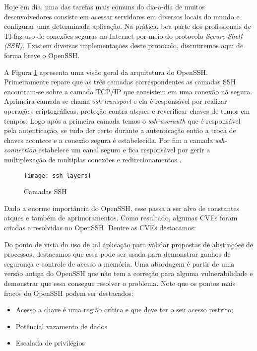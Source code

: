 Hoje em dia, uma das tarefas mais comuns do dia-a-dia de muitos desenvolvedores consiste em acessar servidores em diversos locais do mundo e configurar uma determinada aplicação. Na prática, boa parte dos profissionais de TI faz uso de conexões seguras na Internet por meio do protocolo \textit{Secure Shell (SSH)}. Existem diversas implementações deste protocolo, discutiremos aqui de forma breve o OpenSSH.

A Figura \ref{fig:openssh_layer} apresenta uma visão geral da arquitetura do OpenSSH. Primeiramente repare que as três camadas correspondentes as camadas SSH encontram-se sobre a camada TCP/IP que consistem em uma conexão nã segura. Aprimeira camada se chama \textit{ssh-transport} e ela é responsável por realizar operações criptográficas, proteção contra atques e reverificar chaves de temos em tempos. Logo após a primeira camada temos o \textit{ssh-userauth} que é responsável pela autenticação, se tudo der certo durante a autenticação então a troca de chaves acontece e a conexão segura é estabelecida. Por fim a camada \textit{ssh-connection} estabelece um canal seguro e fica responsável por gerir a multiplexação de multiplas conexões e redirecionamentos \citep{proopenssh, opensshhood}.


\begin{figure}[!h]
  \centering
  \texttt{[image: ssh\_layers]}
  \caption{Camadas SSH \citep{opensshhood}}
  \label{fig:openssh_layer}
\end{figure}

Dado a enorme importância do OpenSSH, esse passa a ser alvo de constantes atques e também de aprimoramentos. Como resultado, algumas CVEs foram criadas e resolvidas no OpenSSH. Dentre as CVEs destacamos:


Do ponto de vista do uso de tal aplicação para validar propostas de abstrações de processos, destacamos que essa pode ser usada para demonstrar ganhos de segurança e controle de acesso a memória. Uma abordagem é partir de uma versão antiga do OpenSSH que não tem a correção para alguma vulnerabilidade e demonstrar que essa consegue resolver o problema. Note que os pontos mais fracos do OpenSSH podem ser destacados:

\begin{itemize}
  \item Acesso a chave é uma região crítica e que deve ter o seu acesso restrito;
  \item Potêncial vazamento de dados
  \item Escalada de privilégios
\end{itemize}
